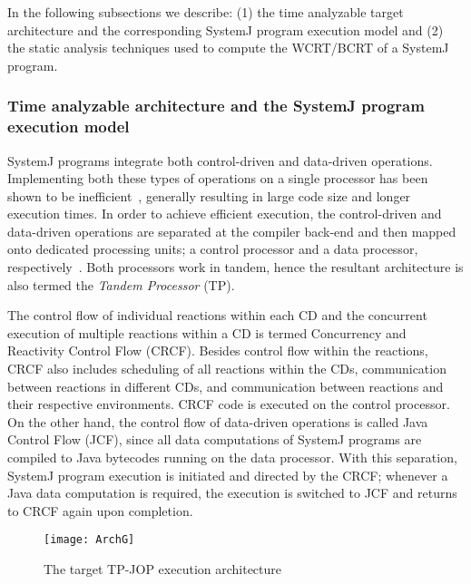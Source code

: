 In the following subsections we describe: (1) the time analyzable target
architecture and the corresponding SystemJ program execution model and
(2) the static analysis techniques used to compute the WCRT/BCRT of a
SystemJ program.

\subsubsection{Time analyzable architecture and the SystemJ program
  execution model}
\label{sec:time-analyz-arch}

SystemJ programs integrate both control-driven and data-driven
operations. Implementing both these types of operations on a single
processor has been shown to be
inefficient~\cite{DBLP:journals/tecs/SalcicM13}, generally resulting in
large code size and longer execution times. In order to achieve
efficient execution, the control-driven and data-driven operations are
separated at the compiler back-end and then mapped onto dedicated
processing units; a control processor and a data processor,
respectively~\cite{DBLP:journals/tecs/SalcicM13}. Both processors work
in tandem, hence the resultant architecture is also termed the
\textit{Tandem Processor} (TP).

The control flow of individual reactions within each CD and the
concurrent execution of multiple reactions within a CD is termed
Concurrency and Reactivity Control Flow (CRCF). Besides control flow
within the reactions, CRCF also includes scheduling of all reactions
within the CDs, communication between reactions in different CDs, and
communication between reactions and their respective environments. CRCF
code is executed on the control processor. On the other hand, the
control flow of data-driven operations is called Java Control Flow
(JCF), since all data computations of SystemJ programs are compiled to
Java bytecodes running on the data processor. With this separation,
SystemJ program execution is initiated and directed by the CRCF;
whenever a Java data computation is required, the execution is switched
to JCF and returns to CRCF again upon completion.

\begin{figure}[t!]
  \centering
  \texttt{[image: ArchG]}
  \caption{The target TP-JOP execution architecture}
  \label{fig:8}
\end{figure}

